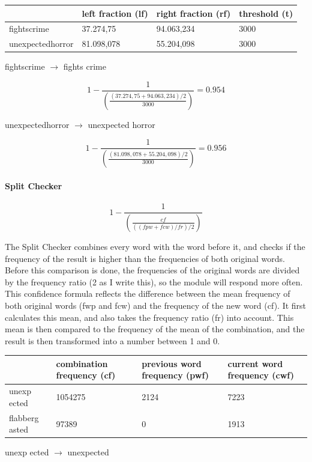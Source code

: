 \documentclass[12pt]{article}
\begin{document}
\begin{table}[h]
\begin{tabular}{|l|lll|}
\hline
&left fraction (lf)&right fraction (rf)&threshold (t)\\ 
\hline
fightscrime&37.274,75&94.063,234&3000\\
unexpectedhorror&81.098,078&55.204,098&3000\\
\hline
\end{tabular}
\end{table}

fightscrime $\rightarrow$ fights crime

\[
1 - \frac{1}{(\frac{(37.274,75+94.063,234)/2}{3000})} = 0.954
\]

unexpectedhorror $\rightarrow$ unexpected horror

\[
1 - \frac{1}{(\frac{(81.098,078+55.204,098)/2}{3000})} = 0.956
\]

\paragraph{Split Checker}

\[
1 - \frac{1}{(\frac{cf}{((fpw+fcw)/fr)/2})}
\]

The Split Checker combines every word with the word before it, and checks if the frequency of the result is higher than the frequencies of both original words. Before this comparison is done, the frequencies of the original words are divided by the frequency ratio (2 as I write this), so the module will respond more often. This confidence formula reflects the difference between the mean frequency of both original words (fwp and fcw) and the frequency of the new word (cf). It first calculates this mean, and also takes the frequency ratio (fr) into account. This mean is then compared to the frequency of the mean of the combination, and the result is then transformed into a number between 1 and 0.

\begin{table}[h]\footnotesize
\begin{tabular}{|l|lll|}
\hline
&combination frequency (cf)&previous word frequency (pwf)&current word frequency (cwf)\\ 
\hline
unexp ected&1054275&2124&7223\\
flabberg asted&97389&0&1913\\
\hline
\end{tabular}
\end{table}

unexp ected $\rightarrow$ unexpected
\end{document}
